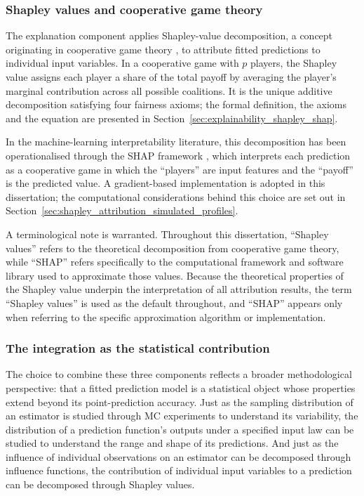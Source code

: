 \subsubsection{Shapley values and cooperative game theory}
\label{sec:shapley_intro}

The explanation component applies Shapley-value decomposition, a concept
originating in cooperative game theory \citep{shapley1953value}, to
attribute fitted predictions to individual input variables.  In a
cooperative game with $p$ players, the Shapley value assigns each
player a share of the total payoff by averaging the player's marginal
contribution across all possible coalitions.  It is the unique additive
decomposition satisfying four fairness axioms; the formal definition,
the axioms and the equation are presented in
Section~\ref{sec:explainability_shapley_shap}.

In the machine-learning interpretability literature, this decomposition
has been operationalised through the SHAP framework
\citep{lundberg2017unified}, which interprets each prediction as a
cooperative game in which the ``players'' are input features and the
``payoff'' is the predicted value.  A gradient-based implementation is
adopted in this dissertation; the computational considerations behind
this choice are set out in
Section~\ref{sec:shapley_attribution_simulated_profiles}.

A terminological note is warranted.  Throughout this dissertation,
``Shapley values'' refers to the theoretical decomposition from
cooperative game theory, while ``SHAP'' refers specifically to the
computational framework and software library used to approximate those
values.  Because the theoretical properties of the Shapley value
underpin the interpretation of all attribution results, the term
``Shapley values'' is used as the default throughout, and ``SHAP''
appears only when referring to the specific approximation algorithm or
implementation.

\subsubsection{The integration as the statistical contribution}
\label{sec:integration_contribution}

The choice to combine these three components reflects a broader
methodological perspective: that a fitted prediction model is a
statistical object whose properties extend beyond its point-prediction
accuracy.  Just as the sampling distribution of an estimator is studied
through MC experiments to understand its variability, the
distribution of a prediction function's outputs under a specified input
law can be studied to understand the range and shape of its predictions.
And just as the influence of individual observations on an estimator can
be decomposed through influence functions, the contribution of
individual input variables to a prediction can be decomposed through
Shapley values.

